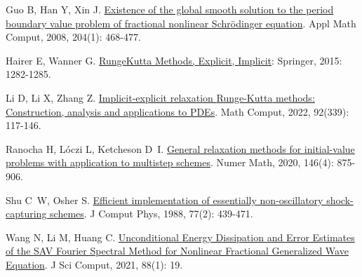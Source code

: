 \begin{thebibliography}{79}
    Guo B, Han Y, Xin J.
    \newblock \href{https://www.sciencedirect.com/science/article/pii/S0096300308005341}{Existence of the global smooth solution to the period boundary value problem of fractional nonlinear {{Schr{\"o}dinger}} equation}\allowbreak[J].
    \newblock Appl Math Comput, 2008, 204\allowbreak (1): 468-477.
    
    Hairer E, Wanner G.
    \newblock \href{https://doi.org/10.1007/978-3-540-70529-1_144}{Runge{\textendash}{{Kutta Methods}}, {{Explicit}}, {{Implicit}}}\allowbreak[M]
    : {Springer}, 2015: 1282-1285.
    
    Li D, Li X, Zhang Z.
    \newblock \href{https://www.ams.org/mcom/2023-92-339/S0025-5718-2022-03766-2/}{Implicit-explicit relaxation {{Runge-Kutta}} methods: Construction, analysis and applications to {{PDEs}}}\allowbreak[J].
    \newblock Math Comput, 2022, 92\allowbreak (339): 117-146.
    
    Ranocha H, L{\'o}czi L, Ketcheson D~I.
    \newblock \href{https://doi.org/10.1007/s00211-020-01158-4}{General relaxation methods for initial-value problems with application to multistep schemes}\allowbreak[J].
    \newblock Numer Math, 2020, 146\allowbreak (4): 875-906.
    
    Shu C~W, Osher S.
    \newblock \href{https://www.sciencedirect.com/science/article/pii/0021999188901775}{Efficient implementation of essentially non-oscillatory shock-capturing schemes}\allowbreak[J].
    \newblock J Comput Phys, 1988, 77\allowbreak (2): 439-471.
    
    Wang N, Li M, Huang C.
    \newblock \href{https://link.springer.com/10.1007/s10915-021-01534-8}{Unconditional {{Energy Dissipation}} and {{Error Estimates}} of the {{SAV Fourier Spectral Method}} for {{Nonlinear Fractional Generalized Wave Equation}}}\allowbreak[J].
    \newblock J Sci Comput, 2021, 88\allowbreak (1): 19.
    
    \end{thebibliography}
    